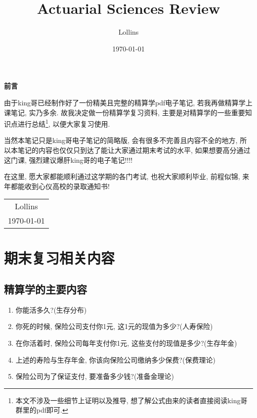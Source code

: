 \documentclass[lang=cn,10pt]{elegantbook}
\title{Actuarial Sciences Review}
\author{Lollins}
\institute{安徽师范大学数学与统计学院}
\date{\today}
\begin{document}
\maketitle

\begin{center}
    \Huge\textbf{前言}
\end{center}
\par
由于king哥已经制作好了一份精美且完整的精算学pdf电子笔记, 若我再做精算学上课笔记, 实乃多余. 故我决定做一份精算学复习资料, 主要是对精算学的一些重要知识点进行总结\footnote{本文不涉及一些细节上证明以及推导, 想了解公式由来的读者直接阅读king哥群里的pdf即可. }, 以便大家复习使用.

当然本笔记只是king哥电子笔记的简略版, 会有很多不完善且内容不全的地方, 所以本笔记的内容也仅仅只到达了能让大家通过期末考试的水平, 如果想要高分通过这门课, 强烈建议爆肝king哥的电子笔记!!!!

在这里, 愿大家都能顺利通过这学期的各门考试, 也祝大家顺利毕业, 前程似锦, 来年都能收到心仪高校的录取通知书!

\begin{flushright}
    \begin{tabular}{c}
        Lollins \\
        \today
    \end{tabular}
\end{flushright}

\newpage
{}
\setcounter{page}{1}
\tableofcontents
\newpage
\setcounter{page}{1}

\chapter*{期末复习相关内容}
\section*{精算学的主要内容}
\begin{enumerate}
    \item 你能活多久?(生存分布)
    \item 你死的时候, 保险公司支付你1元, 这1元的现值为多少?(人寿保险)
    \item 在你活着时, 保险公司每年支付你1元, 这些支付的现值是多少?(生存年金)
    \item 上述的寿险与生存年金, 你该向保险公司缴纳多少保费?(保费理论)
    \item 保险公司为了保证支付, 要准备多少钱?(准备金理论)
\end{enumerate}
\end{document}
